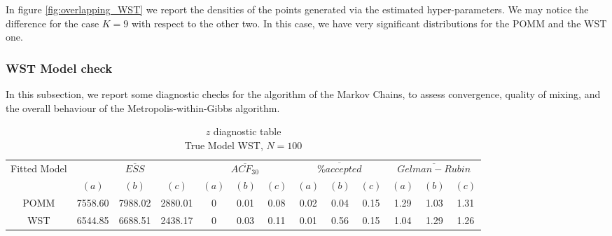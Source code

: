 \documentclass[11pt]{amsart}
\begin{document}
In figure \eqref{fig:overlapping_WST} we report the densities of the points generated via the estimated hyper-parameters. We may notice the difference for the case $K=9$ with respect to the other two. In this case, we have very significant distributions for the POMM and the WST one.


\clearpage




\subsubsection{WST Model check}

In this subsection, we report some diagnostic checks for the algorithm of the Markov Chains, to assess convergence, quality of mixing, and the overall behaviour of the Metropolis-within-Gibbs algorithm.




\begin{table}[h]
\centering
\caption{
{\large $z$ diagnostic table} \\ 
{\small True Model WST, $N=100$}
} 
\begin{tabular}{ccccccccccccc}
\toprule
\multirow{2}{*}{Fitted Model} & \multicolumn{3}{c}{$\overline{ESS}$} & \multicolumn{3}{c}{
$\overline{ACF_{30}}$} & \multicolumn{3}{c}{$\overline{\% accepted}$} & \multicolumn{3}{c}{$\overline{Gelman-Rubin}$}\\
\cmidrule(lr){2-4} \cmidrule(lr){5-7} \cmidrule(lr){8-10} \cmidrule(lr){11-13} 
& $(a)$ & $(b)$ & $(c)$ & $(a)$ & $(b)$ & $(c)$ & $(a)$ & $(b)$ & $(c)$ & $(a)$ & $(b)$ & $(c)$ \\
\midrule
POMM &7558.60 & 7988.02 & 2880.01 & 0 & 0.01 & 0.08 & 0.02 & 0.04 & 0.15 &  1.29 & 1.03 & 1.31  \\
WST &6544.85 & 6688.51 & 2438.17 & 0 & 0.03 & 0.11 & 0.01 & 0.56 & 0.15 & 1.04 & 1.29 & 1.26   \\
\bottomrule
\end{tabular}
\label{table:z_diagnostics_WST}
\end{table}
\end{document}
